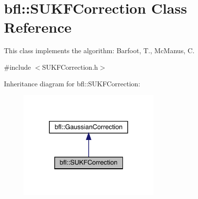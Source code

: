 \hypertarget{classbfl_1_1SUKFCorrection}{}\section{bfl\+:\+:S\+U\+K\+F\+Correction Class Reference}
\label{classbfl_1_1SUKFCorrection}


This class implements the algorithm\+: Barfoot, T., Mc\+Manus, C.  




{\ttfamily \#include $<$S\+U\+K\+F\+Correction.\+h$>$}



Inheritance diagram for bfl\+:\+:S\+U\+K\+F\+Correction\+:
\nopagebreak
\begin{figure}[H]
\begin{center}
\leavevmode
\includegraphics[width=200pt]{classbfl_1_1SUKFCorrection__inherit__graph}
\end{center}
\end{figure}
